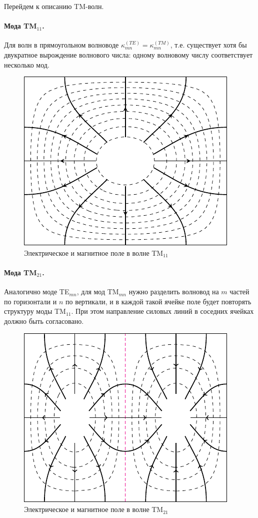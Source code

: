 Перейдем к описанию TM-волн.

\paragraph{Мода TM$_{11}$.} Для волн в прямоугольном волноводе $\kappa_{mn}^{(TE)}=\kappa_{mn}^{(TM)}$, т.е. существует хотя бы двукратное вырождение волнового числа: одному волновому числу соответствует несколько мод.
\begin{figure}[H]
	\centering
	\includegraphics[scale=1.5]{img_lect5/rectangle/TM11}
	\caption{Электрическое и магнитное поле в волне TM$_{11}$}
	\label{fig:rectangle:TM11}
\end{figure}



\paragraph{Мода TM$_{21}$.} Аналогично моде TE$_{mn}$, для мод TM$_{mn}$ нужно разделить волновод на $m$ частей по горизонтали и $n$ по вертикали, и в каждой такой ячейке поле будет повторять структуру моды TM$_{11}$. При этом направление силовых линий в соседних ячейках должно быть согласовано.
\begin{figure}[H]
	\centering
	\includegraphics[scale=1.5]{img_lect5/rectangle/TM21}
	\caption{Электрическое и магнитное поле в волне TM$_{21}$}
	\label{fig:rectangle:TM21}
\end{figure}

